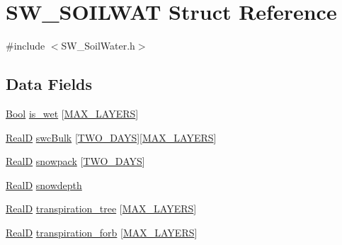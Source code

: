 \hypertarget{struct_s_w___s_o_i_l_w_a_t}{}\section{S\+W\+\_\+\+S\+O\+I\+L\+W\+AT Struct Reference}
\label{struct_s_w___s_o_i_l_w_a_t}


{\ttfamily \#include $<$S\+W\+\_\+\+Soil\+Water.\+h$>$}

\subsection*{Data Fields}
\begin{DoxyCompactItemize}
\item 
\hyperlink{generic_8h_a39db6982619d623273fad8a383489309}{Bool} \hyperlink{struct_s_w___s_o_i_l_w_a_t_a91c38cb36f890054c8c7cac57fa9e1c3}{is\+\_\+wet} \mbox{[}\hyperlink{_s_w___defines_8h_ade9d4b2ac5f29fe89ffea40e7c58c9d6}{M\+A\+X\+\_\+\+L\+A\+Y\+E\+RS}\mbox{]}
\item 
\hyperlink{generic_8h_af1c105fd5732f70b91ddaeda0cc340e3}{RealD} \hyperlink{struct_s_w___s_o_i_l_w_a_t_a7d8626416b6c3999010e5e6f3b0b8b88}{swc\+Bulk} \mbox{[}\hyperlink{_s_w___defines_8h_aa13584938d6d242c32df06115a94b01a}{T\+W\+O\+\_\+\+D\+A\+YS}\mbox{]}\mbox{[}\hyperlink{_s_w___defines_8h_ade9d4b2ac5f29fe89ffea40e7c58c9d6}{M\+A\+X\+\_\+\+L\+A\+Y\+E\+RS}\mbox{]}
\item 
\hyperlink{generic_8h_af1c105fd5732f70b91ddaeda0cc340e3}{RealD} \hyperlink{struct_s_w___s_o_i_l_w_a_t_a62e49bd4b9572f84fa6089324d5599ef}{snowpack} \mbox{[}\hyperlink{_s_w___defines_8h_aa13584938d6d242c32df06115a94b01a}{T\+W\+O\+\_\+\+D\+A\+YS}\mbox{]}
\item 
\hyperlink{generic_8h_af1c105fd5732f70b91ddaeda0cc340e3}{RealD} \hyperlink{struct_s_w___s_o_i_l_w_a_t_ae42a92727559a0b8d92e5506496718cd}{snowdepth}
\item 
\hyperlink{generic_8h_af1c105fd5732f70b91ddaeda0cc340e3}{RealD} \hyperlink{struct_s_w___s_o_i_l_w_a_t_a5daee6e2e1a9137b841071b737e91774}{transpiration\+\_\+tree} \mbox{[}\hyperlink{_s_w___defines_8h_ade9d4b2ac5f29fe89ffea40e7c58c9d6}{M\+A\+X\+\_\+\+L\+A\+Y\+E\+RS}\mbox{]}
\item 
\hyperlink{generic_8h_af1c105fd5732f70b91ddaeda0cc340e3}{RealD} \hyperlink{struct_s_w___s_o_i_l_w_a_t_a68e5c33a1f6adf10b5a753a05f624d8d}{transpiration\+\_\+forb} \mbox{[}\hyperlink{_s_w___defines_8h_ade9d4b2ac5f29fe89ffea40e7c58c9d6}{M\+A\+X\+\_\+\+L\+A\+Y\+E\+RS}\mbox{]}

\end{DoxyCompactItemize}
